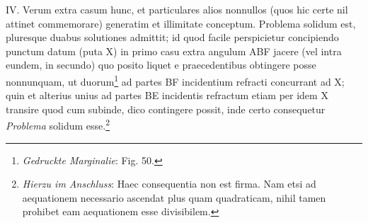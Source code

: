  \pstart [p.~39] IV. Verum extra casum hunc, et particulares alios nonnullos (quos hic certe nil attinet commemorare) generatim et illimitate conceptum. Problema solidum est, pluresque duabus solutiones admittit; id quod facile perspicietur concipiendo punctum datum (puta X) in primo casu extra angulum ABF jacere (vel intra eundem, in secundo) quo posito liquet e praecedentibus obtingere posse nonnunquam, ut duorum\footnote{\textit{Gedruckte Marginalie}: Fig. 50.} ad partes BF incidentium refracti concurrant ad X; quin et alterius unius ad partes BE incidentis refractum etiam per idem X trans\-ire quod cum subinde, dico contingere possit, inde certo consequetur \textit{Problema} solidum esse.\footnote{\textit{Hierzu im Anschluss}: Haec consequentia non est firma. Nam etsi ad aequationem necessario ascendat plus quam quadraticam, nihil tamen prohibet eam aequationem esse divisibilem.}
 \pend